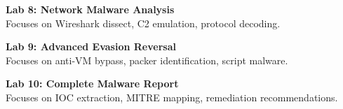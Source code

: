 \vspace{0.2cm}

\noindent\textbf{Lab 8: Network Malware Analysis} \\
Focuses on Wireshark dissect, C2 emulation, protocol decoding.

\vspace{0.2cm}

\noindent\textbf{Lab 9: Advanced Evasion Reversal} \\
Focuses on anti-VM bypass, packer identification, script malware.

\vspace{0.2cm}

\noindent\textbf{Lab 10: Complete Malware Report} \\
Focuses on IOC extraction, MITRE mapping, remediation recommendations.

\vspace{0.2cm}

\newpage
{}
